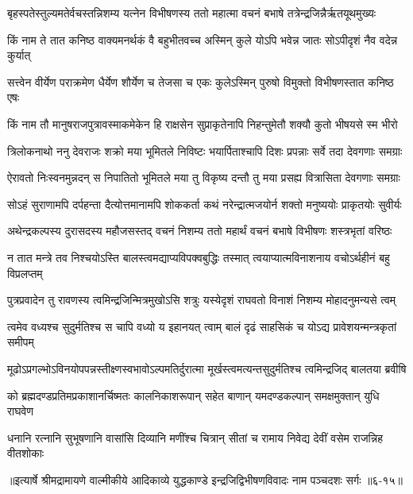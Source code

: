 
\twolineshloka
{बृहस्पतेस्तुल्यमतेर्वचस्तन्निशम्य यत्नेन विभीषणस्य}
{ततो महात्मा वचनं बभाषे तत्रेन्द्रजिन्नैर्ऋतयूथमुख्यः} %

\twolineshloka
{किं नाम ते तात कनिष्ठ वाक्यमनर्थकं वै बहुभीतवच्च}
{अस्मिन् कुले योऽपि भवेन्न जातः सोऽपीदृशं नैव वदेन्न कुर्यात्} %

\twolineshloka
{सत्त्वेन वीर्येण पराक्रमेण धैर्येण शौर्येण च तेजसा च}
{एकः कुलेऽस्मिन् पुरुषो विमुक्तो विभीषणस्तात कनिष्ठ एषः} %

\twolineshloka
{किं नाम तौ मानुषराजपुत्रावस्माकमेकेन हि राक्षसेन}
{सुप्राकृतेनापि निहन्तुमेतौ शक्यौ कुतो भीषयसे स्म भीरो} %

\twolineshloka
{त्रिलोकनाथो ननु देवराजः शक्रो मया भूमितले निविष्टः}
{भयार्पिताश्चापि दिशः प्रपन्नाः सर्वे तदा देवगणाः समग्राः} %

\twolineshloka
{ऐरावतो निःस्वनमुन्नदन् स निपातितो भूमितले मया तु}
{विकृष्य दन्तौ तु मया प्रसह्य वित्रासिता देवगणाः समग्राः} %

\twolineshloka
{सोऽहं सुराणामपि दर्पहन्ता दैत्योत्तमानामपि शोककर्ता}
{कथं नरेन्द्रात्मजयोर्न शक्तो मनुष्ययोः प्राकृतयोः सुवीर्यः} %

\twolineshloka
{अथेन्द्रकल्पस्य दुरासदस्य महौजसस्तद् वचनं निशम्य}
{ततो महार्थं वचनं बभाषे विभीषणः शस्त्रभृतां वरिष्ठः} %

\twolineshloka
{न तात मन्त्रे तव निश्चयोऽस्ति बालस्त्वमद्याप्यविपक्वबुद्धिः}
{तस्मात् त्वयाप्यात्मविनाशनाय वचोऽर्थहीनं बहु विप्रलप्तम्} %

\twolineshloka
{पुत्रप्रवादेन तु रावणस्य त्वमिन्द्रजिन्मित्रमुखोऽसि शत्रुः}
{यस्येदृशं राघवतो विनाशं निशम्य मोहादनुमन्यसे त्वम्} %

\twolineshloka
{त्वमेव वध्यश्च सुदुर्मतिश्च स चापि वध्यो य इहानयत् त्वाम्}
{बालं दृढं साहसिकं च योऽद्य प्रावेशयन्मन्त्रकृतां समीपम्} %

\twolineshloka
{मूढोऽप्रगल्भोऽविनयोपपन्नस्तीक्ष्णस्वभावोऽल्पमतिर्दुरात्मा}
{मूर्खस्त्वमत्यन्तसुदुर्मतिश्च त्वमिन्द्रजिद् बालतया ब्रवीषि} %

\twolineshloka
{को ब्रह्मदण्डप्रतिमप्रकाशानर्चिष्मतः कालनिकाशरूपान्}
{सहेत बाणान् यमदण्डकल्पान् समक्षमुक्तान् युधि राघवेण} %

\twolineshloka
{धनानि रत्नानि सुभूषणानि वासांसि दिव्यानि मणींश्च चित्रान्}
{सीतां च रामाय निवेद्य देवीं वसेम राजन्निह वीतशोकाः} %


॥इत्यार्षे श्रीमद्रामायणे वाल्मीकीये आदिकाव्ये युद्धकाण्डे इन्द्रजिद्विभीषणविवादः नाम पञ्चदशः सर्गः ॥६-१५॥
